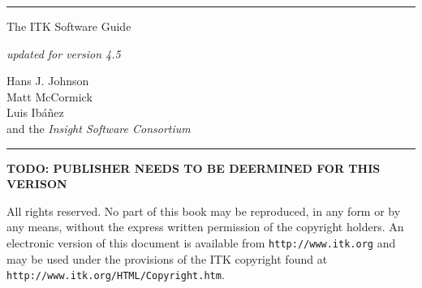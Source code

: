 
\begin{minipage}[t][3cm][b]{\textwidth}
\rule{14cm}{1pt}
\end{minipage}


\begin{minipage}[t][3cm][b]{\textwidth}
\Huge
The ITK Software Guide\\
\normalsize
\par
\emph{updated for version 4.5}\\
\end{minipage}

\hfill
\begin{minipage}[t][6cm][b]{0.6\textwidth}
\Large
\renewcommand{\baselinestretch}{1.5}
Hans J. Johnson\\
Matt McCormick \\
Luis Ib\'{a}\~{n}ez\\
and the \emph{Insight Software Consortium}
\normalsize
\end{minipage}


\begin{minipage}[t][2cm][b]{\textwidth}
\rule{14cm}{1pt}
\end{minipage}

\newpage

\begin{minipage}[t][4cm][b]{\textwidth}
\begin{center}
\end{center}
\par
\begin{center}
\large
\bf{TODO: PUBLISHER NEEDS TO BE DEERMINED FOR THIS VERISON}

\normalsize
\end{center}
\end{minipage}


\begin{minipage}[t][2.25cm][b]{\textwidth}
\begin{center}
All rights reserved. No part of this book may be reproduced, in any form
or by any means, without the express written permission of the copyright
holders. An electronic version of this document is available from
\texttt{http://www.itk.org} and may be used under the provisions of the
ITK copyright found at \texttt{http://www.itk.org/HTML/Copyright.htm}.
\end{center}
\end{minipage}


